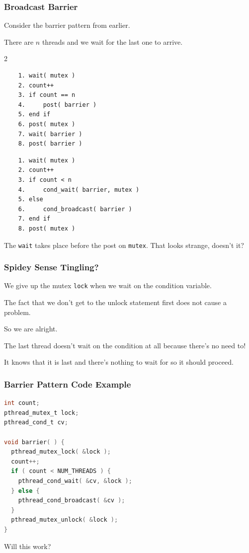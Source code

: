 \begin{frame}[fragile]
	\frametitle{Broadcast Barrier}

	Consider the barrier pattern from earlier.

	There are $n$ threads and we wait for the last one to arrive.
		{\scriptsize
			\begin{multicols}{2}
				\begin{verbatim}
	1. wait( mutex )
	2. count++
	3. if count == n
	4.     post( barrier )
	5. end if
	6. post( mutex )
	7. wait( barrier )
	8. post( barrier )
  \end{verbatim}
				\columnbreak
				\begin{verbatim}
	1. wait( mutex )
	2. count++
	3. if count < n
	4.     cond_wait( barrier, mutex )
	5. else 
	6.     cond_broadcast( barrier )
	7. end if
	8. post( mutex )
  \end{verbatim}
			\end{multicols}
		}

	The \texttt{wait} takes place before the post on \texttt{mutex}. That looks strange, doesn't it?

\end{frame}


\begin{frame}
	\frametitle{Spidey Sense Tingling?}


	We give up the mutex \texttt{lock} when we wait on the condition variable.

	The fact that we don't get to the unlock statement first does not cause a problem.

	So we are alright.

	The last thread doesn't wait on the condition at all because there's no need to!

	It knows that it is last and there's nothing to wait for so it should proceed.

\end{frame}

\begin{frame}[fragile]
	\frametitle{Barrier Pattern Code Example}
	\begin{lstlisting}[language=C]
int count;
pthread_mutex_t lock;
pthread_cond_t cv; 

void barrier( ) {
  pthread_mutex_lock( &lock );
  count++;
  if ( count < NUM_THREADS ) {
    pthread_cond_wait( &cv, &lock );
  } else {
    pthread_cond_broadcast( &cv );
  }
  pthread_mutex_unlock( &lock );
}
\end{lstlisting}

	Will this work?

\end{frame}


